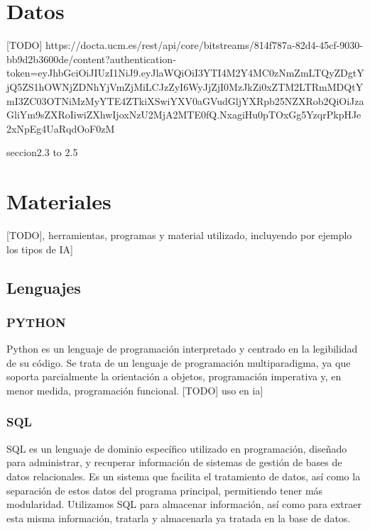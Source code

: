 

\section{Datos} \label{sec:Materiales_datos}

[TODO]
https://docta.ucm.es/rest/api/core/bitstreams/814f787a-82d4-45cf-9030-bb9d2b3600de/content?authentication-token=eyJhbGciOiJIUzI1NiJ9.eyJlaWQiOiI3YTI4M2Y4MC0zNmZmLTQyZDgtYjQ5ZS1hOWNjZDNhYjVmZjMiLCJzZyI6WyJjZjI0MzJkZi0xZTM2LTRmMDQtYmI3ZC03OTNiMzMyYTE4ZTkiXSwiYXV0aGVudGljYXRpb25NZXRob2QiOiJzaGliYm9sZXRoIiwiZXhwIjoxNzU2MjA2MTE0fQ.NxagiHu0pTOxGg5YzqrPkpHJe2xNpEg4UaRqdOoF0zM

seccion2.3 to 2.5

\section{Materiales}

[TODO], herramientas, programas y material utilizado, incluyendo por ejemplo los tipos de IA]

\subsection{Lenguajes} 

\subsubsection*{PYTHON}
Python es un lenguaje de programación interpretado y centrado en la legibilidad de su código. Se trata de un lenguaje de programación multiparadigma, ya que soporta parcialmente la orientación a objetos, programación imperativa y, en menor medida, programación funcional. [TODO] uso en ia]

\subsubsection*{SQL}
SQL es un lenguaje de dominio específico utilizado en programación, diseñado para administrar, y recuperar información de sistemas de gestión de bases de datos relacionales. Es un sistema que facilita el tratamiento de datos, así como la separación de estos datos del programa principal, permitiendo tener más modularidad.
Utilizamos SQL para almacenar información, así como para extraer esta misma información, tratarla y almacenarla ya tratada en la base de datos. 

